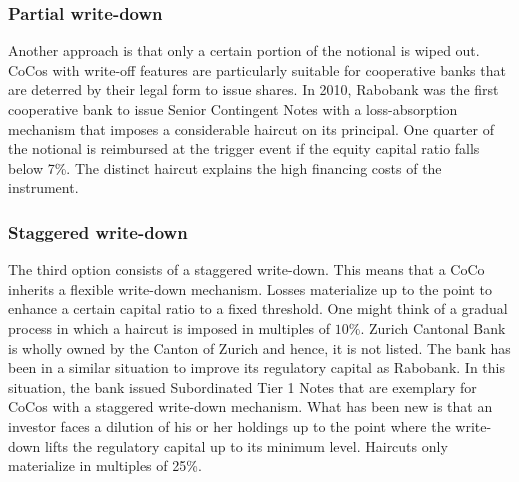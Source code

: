 \subsubsection*{Partial write-down}
Another approach is that only a certain portion of the notional is wiped out. CoCos with write-off features are particularly suitable for cooperative banks that are deterred by their legal form to issue shares. \citep{de2014handbook} In 2010, Rabobank was the first cooperative bank to issue Senior Contingent Notes with a loss-absorption mechanism that imposes a considerable haircut on its principal. One quarter of the notional is reimbursed at the trigger event if the equity capital ratio falls below 7\%. The distinct haircut explains the high financing costs of the instrument. 
\citep{rabobank2010}

\subsubsection*{Staggered write-down}
The third option consists of a staggered write-down. This means that a CoCo inherits a flexible write-down mechanism. Losses materialize up to the point to enhance a certain capital ratio to a fixed threshold. One might think of a gradual process in which a haircut is imposed in multiples of $10\%$. \citep{de2014handbook} Zurich Cantonal Bank is wholly owned by the Canton of Zurich and hence, it is not listed. The bank has been in a similar situation to improve its regulatory capital as Rabobank. In this situation, the bank issued Subordinated Tier 1 Notes that are exemplary for CoCos with a staggered write-down mechanism. What has been new is that an investor faces a dilution of his or her holdings up to the point where the write-down lifts the regulatory capital up to its minimum level. Haircuts only materialize in multiples of 25\%. \citep{zkv2013}




